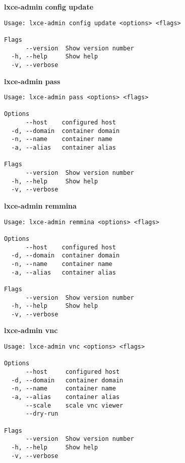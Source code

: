 \textbf{lxce-admin config update}
\begin{verbatim}
Usage: lxce-admin config update <options> <flags>

Flags
      --version  Show version number                                   
  -h, --help     Show help                                             
  -v, --verbose
\end{verbatim}

\newpage
\textbf{lxce-admin pass}
\begin{verbatim}
Usage: lxce-admin pass <options> <flags>

Options
      --host    configured host                              
  -d, --domain  container domain                             
  -n, --name    container name                               
  -a, --alias   container alias                              

Flags
      --version  Show version number                        
  -h, --help     Show help                                  
  -v, --verbose
\end{verbatim}

\textbf{lxce-admin remmina}
\begin{verbatim}
Usage: lxce-admin remmina <options> <flags>

Options
      --host    configured host                              
  -d, --domain  container domain                             
  -n, --name    container name                               
  -a, --alias   container alias                              

Flags
      --version  Show version number                        
  -h, --help     Show help                                  
  -v, --verbose
\end{verbatim}

\newpage
\textbf{lxce-admin vnc}
\begin{verbatim}
Usage: lxce-admin vnc <options> <flags>

Options
      --host     configured host                             
  -d, --domain   container domain                            
  -n, --name     container name                              
  -a, --alias    container alias                             
      --scale    scale vnc viewer                            
      --dry-run                                              

Flags
      --version  Show version number                        
  -h, --help     Show help                                  
  -v, --verbose
\end{verbatim}
